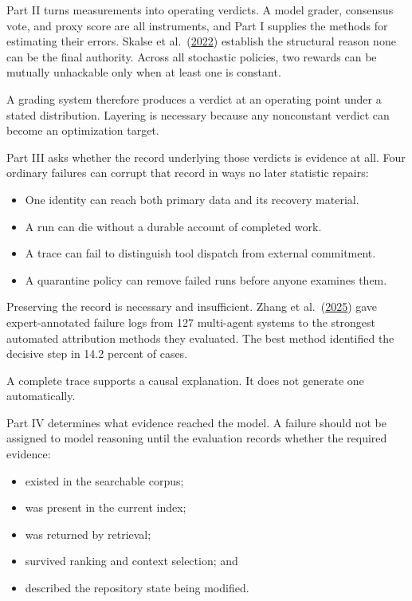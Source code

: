Part II turns measurements into operating verdicts. A model grader, consensus vote, and proxy score are all instruments, and Part I supplies the methods for estimating their errors. Skalse et al.~(\href{https://arxiv.org/abs/2209.13085}{2022}) establish the structural reason none can be the final authority. Across all stochastic policies, two rewards can be mutually unhackable only when at least one is constant.

A grading system therefore produces a verdict at an operating point under a stated distribution. Layering is necessary because any nonconstant verdict can become an optimization target.

Part III asks whether the record underlying those verdicts is evidence at all. Four ordinary failures can corrupt that record in ways no later statistic repairs:

\begin{itemize}
\tightlist
\item
  One identity can reach both primary data and its recovery material.
\item
  A run can die without a durable account of completed work.
\item
  A trace can fail to distinguish tool dispatch from external commitment.
\item
  A quarantine policy can remove failed runs before anyone examines them.
\end{itemize}

Preserving the record is necessary and insufficient. Zhang et al.~(\href{https://arxiv.org/abs/2505.00212}{2025}) gave expert-annotated failure logs from 127 multi-agent systems to the strongest automated attribution methods they evaluated. The best method identified the decisive step in 14.2 percent of cases.

A complete trace supports a causal explanation. It does not generate one automatically.

Part IV determines what evidence reached the model. A failure should not be assigned to model reasoning until the evaluation records whether the required evidence:

\begin{itemize}
\tightlist
\item
  existed in the searchable corpus;
\item
  was present in the current index;
\item
  was returned by retrieval;
\item
  survived ranking and context selection; and
\item
  described the repository state being modified.
\end{itemize}

